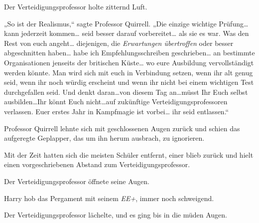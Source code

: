 Der Verteidigungsprofessor holte zitternd Luft.

„So ist der Realismus,“ sagte Professor Quirrell. „Die einzige wichtige Prüfung… kann jederzeit kommen… seid besser darauf vorbereitet… als sie es war. Was den Rest von euch angeht… diejenigen, die \emph{Erwartungen übertroffen} oder besser abgeschnitten haben… habe ich Empfehlungsschreiben geschrieben… an bestimmte Organisationen jenseits der britischen Küste… wo eure Ausbildung vervollständigt werden könnte. Man wird sich mit euch in Verbindung setzen, wenn ihr alt genug seid, wenn ihr noch würdig erscheint und wenn ihr nicht bei einem wichtigen Test durchgefallen seid. Und denkt daran…von diesem Tag an…müsst Ihr Euch selbst ausbilden…Ihr könnt Euch nicht…auf zukünftige Verteidigungsprofessoren verlassen. Euer erstes Jahr in Kampfmagie ist vorbei… ihr seid entlassen.“

Professor Quirrell lehnte sich mit geschlossenen Augen zurück und schien das aufgeregte Geplapper, das um ihn herum ausbrach, zu ignorieren.

Mit der Zeit hatten sich die meisten Schüler entfernt, einer blieb zurück und hielt einen vorgeschriebenen Abstand zum Verteidigungsprofessor.

Der Verteidigungsprofessor öffnete seine Augen.

Harry hob das Pergament mit seinem \emph{EE+}, immer noch schweigend.

Der Verteidigungsprofessor lächelte, und es ging bis in die müden Augen.

